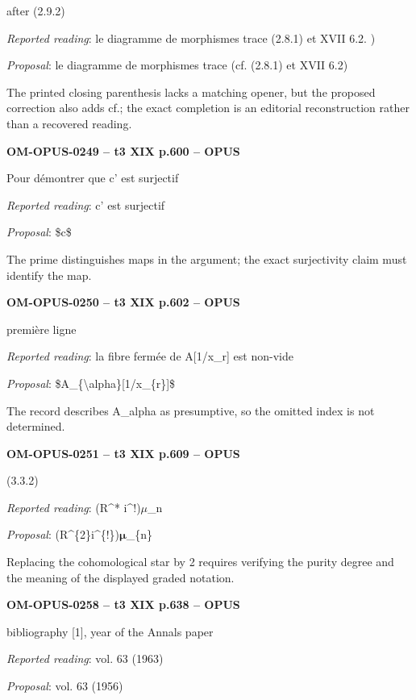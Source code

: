 after (2.9.2)\par
\emph{Reported reading}: le diagramme de morphismes trace (2.8.1) et XVII 6.2. )\par
\emph{Proposal}: le diagramme de morphismes trace (cf. (2.8.1) et XVII 6.2)\par
The printed closing parenthesis lacks a matching opener, but the proposed correction also adds cf.; the exact completion is an editorial reconstruction rather than a recovered reading.\par
\par\noindent\textbf{OM-OPUS-0249 -- t3 XIX p.600 -- OPUS}\par
Pour démontrer que c' est surjectif\par
\emph{Reported reading}: c' est surjectif\par
\emph{Proposal}: \$c\$\par
The prime distinguishes maps in the argument; the exact surjectivity claim must identify the map.\par
\par\noindent\textbf{OM-OPUS-0250 -- t3 XIX p.602 -- OPUS}\par
première ligne\par
\emph{Reported reading}: la fibre fermée de A[1/x\_r] est non-vide\par
\emph{Proposal}: \$A\_\{\textbackslash{}alpha\}[1/x\_\{r\}]\$\par
The record describes A\_alpha as presumptive, so the omitted index is not determined.\par
\par\noindent\textbf{OM-OPUS-0251 -- t3 XIX p.609 -- OPUS}\par
(3.3.2)\par
\emph{Reported reading}: (R\textasciicircum{}* i\textasciicircum{}!)\ensuremath{\mu}\_n\par
\emph{Proposal}: (R\textasciicircum{}\{2\}i\textasciicircum{}\{!\})\ensuremath{𝛍}\_\{n\}\par
Replacing the cohomological star by 2 requires verifying the purity degree and the meaning of the displayed graded notation.\par
\par\noindent\textbf{OM-OPUS-0258 -- t3 XIX p.638 -- OPUS}\par
bibliography [1], year of the Annals paper\par
\emph{Reported reading}: vol. 63 (1963)\par
\emph{Proposal}: vol. 63 (1956)\par
